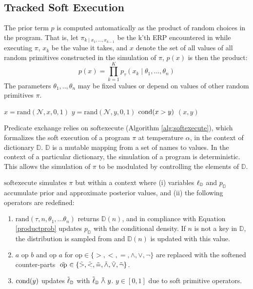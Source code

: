 \subsection{Tracked Soft Execution}
The prior term $p$ is computed automatically as the product of random choices in the program. 
That is, let $\pi_{k \mid x_1, ..., x_{k-1}}$ be the k'th ERP encountered in while executing $\pi$, $x_k$ be the value it takes, and $x$ denote the set of all values of all random primitives constructed in the simulation of $\pi$, $p(x)$ is then the product:
\begin{equation}\label{productprob}
p(x) = \prod_{k=1}^K p_\tau(x_k \mid \theta_1,..., \theta_n )
\end{equation}
The parameters $\theta_1,..,\theta_n$ may be fixed values or depend on values of other random primitives $\pi$.

\begin{exprogram}[tb]
\caption{}
\label{prog:ex1}
\begin{algorithmic}
\STATE $x = \textrm{rand}(\mathcal{N}, x, 0, 1)$
\STATE $y = \textrm{rand}(\mathcal{N}, y, 0, 1)$
\STATE $\operatorname{cond}(x > y)$
 $(x, y)$
\end{algorithmic}
\end{exprogram}


Predicate exchange relies on $\textrm{softexecute}$
(Algorithm \ref{alg:softexecute}), which formalizes the soft execution of a program $\pi$ at temperature $\alpha$, in the context of dictionary $\mathbb{D}$.
$\mathbb{D}$ is a mutable mapping from a set of names to values.
In the context of a particular dictionary, the simulation of a program is deterministic.
This allows the simulation of $\pi$ to be modulated by controlling the elements of $\mathbb{D}$.

$\textrm{softexecute}$ simulates $\pi$ but within a context where (i) variables $\operatorname{\ell}_\mathbb{D}$ and $p_\mathbb{D}$ accumulate prior and approximate posterior values, and (ii) the following operators are redefined:

\begin{enumerate}
  \item $\textrm{rand}(\tau, n, \theta_1, ...\theta_n)$ returns $\mathbb{D}(n)$, and in compliance with Equation \ref{productprob} updates $p_\mathbb{D}$ with the conditional density. If $n$ is not a key in $\mathbb{D}$, the distribution is sampled from and $\mathbb{D}(n)$ is updated with this value.  
  \item $a \text{ op } b$ and $\textrm{op } a$ for $\textrm{op} \in \{>, <, =, \land, \lor, \neg\}$ are replaced with the softened counter-parts $\mathrel{\tilde{\textrm{ op }}} \in \{\mathrel{\tilde{>}}, \mathrel{\tilde{<}}, \mathrel{\tilde{=}}, \mathrel{\tilde{\land}}, \mathrel{\tilde{\lor}}, \mathrel{\tilde{\neg}}\}$.
  \item $\operatorname{cond}(y)$ updates $\tilde{\operatorname{\ell}}_\mathbb{D}$ with $\tilde{\operatorname{\ell}}_\mathbb{D} \mathrel{\tilde{\land}} y$. $y \in [0,1]$ due to soft primitive operators.  
\end{enumerate}

